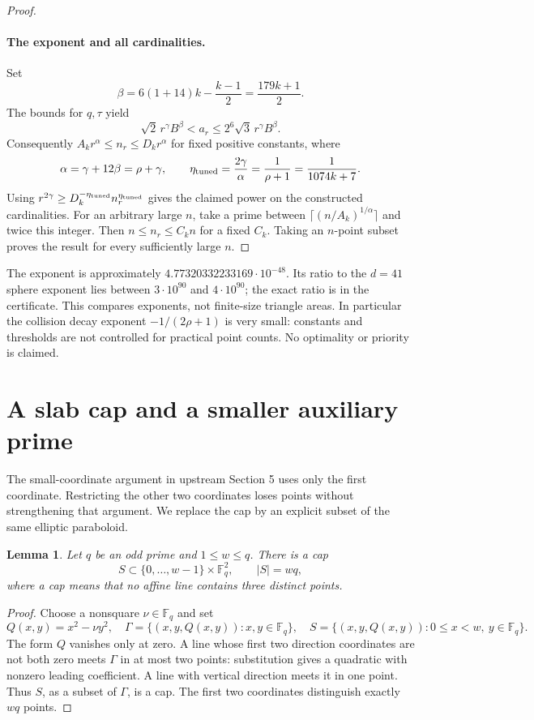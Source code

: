 \documentclass[11pt]{article}
\newtheorem{lemma}{Lemma}
\begin{document}
\begin{proof}
\paragraph{The exponent and all cardinalities.}
Set
\[
 \beta=6(1+14)k-\frac{k-1}{2}=\frac{179k+1}{2}.
\]
The bounds for \(q,\tau\) yield
\[
 \sqrt2\,r^\gamma B^\beta<a_r
 \le2^6\sqrt3\,r^\gamma B^\beta.
\]
Consequently \(A_kr^\alpha\le n_r\le D_kr^\alpha\) for fixed positive
constants, where
\[
 \alpha=\gamma+12\beta=\rho+\gamma,\qquad
 \eta_{\rm tuned}=\frac{2\gamma}{\alpha}
 =\frac1{\rho+1}=\frac1{1074k+7}.
\]
Using \(r^{2\gamma}\ge D_k^{-\eta_{\rm tuned}}n_r^{\eta_{\rm tuned}}\)
gives the claimed power on the constructed cardinalities.
For an arbitrary large \(n\), take a prime between
\(\lceil(n/A_k)^{1/\alpha}\rceil\) and twice this integer.
Then \(n\le n_r\le C_kn\) for a fixed \(C_k\). Taking an \(n\)-point
subset proves the result for every sufficiently large \(n\).
\end{proof}

The exponent is approximately \(4.77320332233169\cdot10^{-48}\).
Its ratio to the \(d=41\) sphere exponent lies between
\(3\cdot10^{90}\) and \(4\cdot10^{90}\); the exact ratio is in the
certificate. This compares exponents, not finite-size triangle areas.
In particular the collision decay exponent
\(-1/(2\rho+1)\) is very small: constants and thresholds are not
controlled for practical point counts. No optimality or priority is claimed.

\section{A slab cap and a smaller auxiliary prime}\label{sec:slab}
The small-coordinate argument in upstream Section 5 uses only the
first coordinate. Restricting the other two coordinates loses points
without strengthening that argument. We replace the cap by an explicit
subset of the same elliptic paraboloid.

\begin{lemma}\label{lem:slab}
Let \(q\) be an odd prime and \(1\le w\le q\). There is a cap
\[
 S\subset\{0,\ldots,w-1\}\times\mathbb F_q^2,\qquad |S|=wq,
\]
where a cap means that no affine line contains three distinct points.
\end{lemma}
\begin{proof}
Choose a nonsquare \(\nu\in\mathbb F_q\) and set
\[
 Q(x,y)=x^2-\nu y^2,\quad
 \Gamma=\{(x,y,Q(x,y)):x,y\in\mathbb F_q\},\quad
 S=\{(x,y,Q(x,y)):0\le x<w,\ y\in\mathbb F_q\}.
\]
The form \(Q\) vanishes only at zero. A line whose first two direction
coordinates are not both zero meets \(\Gamma\) in at most two points:
substitution gives a quadratic with nonzero leading coefficient.
A line with vertical direction meets it in one point. Thus \(S\),
as a subset of \(\Gamma\), is a cap. The first two coordinates
distinguish exactly \(wq\) points.
\end{proof}
\end{document}
